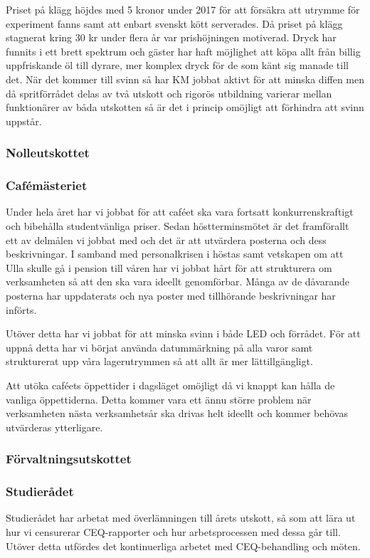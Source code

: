 \documentclass[../_main/handlingar.tex]{subfiles}
\begin{document}
Priset på klägg höjdes med 5 kronor under 2017 för att försäkra att utrymme för experiment fanns samt att enbart svenskt kött serverades. Då priset på klägg stagnerat kring 30 kr under flera år var prishöjningen motiverad. Dryck har funnits i ett brett spektrum och gäster har haft möjlighet att köpa allt från billig uppfriskande öl till dyrare, mer komplex dryck för de som känt sig manade till det. När det kommer till svinn så har KM jobbat aktivt för att minska diffen men då spritförrådet delas av två utskott och rigorös utbildning varierar mellan funktionärer av båda utskotten så är det i princip omöjligt att förhindra att svinn uppstår.

\subsubsection*{Nolleutskottet}

\subsubsection*{Cafémästeriet}
Under hela året har vi jobbat för att caféet ska vara fortsatt konkurrenskraftigt och bibehålla studentvänliga priser. Sedan höstterminsmötet är det framförallt ett av delmålen vi jobbat med och det är att utvärdera posterna och dess beskrivningar. I samband med personalkrisen i höstas samt vetskapen om att Ulla skulle gå i pension till våren har vi jobbat hårt för att strukturera om verksamheten så att den ska vara ideellt genomförbar. Många av de dåvarande posterna har uppdaterats och nya poster med tillhörande beskrivningar har införts.

Utöver detta har vi jobbat för att minska svinn i både LED och förrådet. För att uppnå detta har vi börjat använda datummärkning på alla varor samt strukturerat upp våra lagerutrymmen så att allt är mer lättillgängligt.

Att utöka caféets öppettider i dagsläget omöjligt då vi knappt kan hålla de vanliga öppettiderna. Detta kommer vara ett ännu större problem när verksamheten nästa verksamhetsår ska drivas helt ideellt och kommer behövas utvärderas ytterligare.

\subsubsection*{Förvaltningsutskottet}

\subsubsection*{Studierådet}
Studierådet har arbetat med överlämningen till årets utskott, så som att lära ut hur vi censurerar CEQ-rapporter och hur arbetsprocessen med dessa går till. Utöver detta utfördes det kontinuerliga arbetet med CEQ-behandling och möten.
\end{document}
